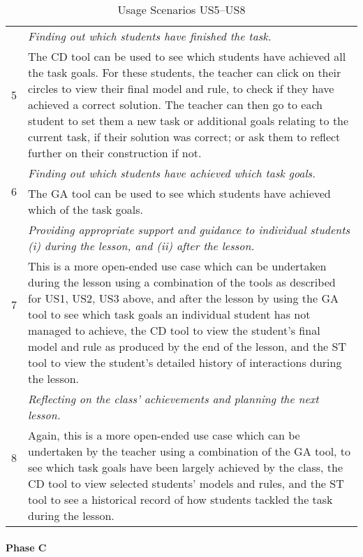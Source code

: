 \begin{table}[htbp]
  \begin{tabular}{|p{0.5cm}|p{12.5cm}|}
  \hline \multirow{2}{*}{5}
  & \emph{Finding out which students have finished the task.} \\
  \cline{2-2}
  & The CD tool can be used to see which students have achieved all
  the task goals. For these students, the teacher can click on their
  circles to view their final model and rule, to check if they have
  achieved a correct solution. The teacher can then go to each student
  to set them a new task or additional goals relating to the current
  task, if their solution was correct; or ask them to reflect further
  on their construction if not. \\
  \hline \multirow{2}{*}{6}
  & \emph{Finding out which students have achieved which task goals.} \\
  \cline{2-2}
  & The GA tool can be used to see which students have achieved which
  of the task goals. \\
  \hline \multirow{2}{*}{7}
  & \emph{Providing appropriate support and guidance to individual
  students (i) during the lesson, and (ii) after the lesson.} \\
  \cline{2-2}
  &  This is a more open-ended use case which can be undertaken during
  the lesson using a combination of the tools as described for US1,
  US2, US3 above, and after the lesson by using the GA tool to see
  which task goals an individual student has not managed to achieve,
  the CD tool to view the student's final model and rule as produced
  by the end of the lesson, and the ST tool to view the student's
  detailed history of interactions
  during the lesson.  \\
  \hline \multirow{2}{*}{8}
  & \emph{Reflecting on the class' achievements and planning the next
  lesson.} \\
  \cline{2-2}
  &  Again, this is a more open-ended use case which can be undertaken by
  the teacher using a combination of the GA tool, to see which task
  goals have been largely achieved by the class, the CD tool to view
  selected students' models and rules, and the ST tool to see a
  historical record of how students tackled the task during the
  lesson.
   \\
  \hline
  \end{tabular}
  \caption{Usage Scenarios US5--US8}
  \label{tab:UsageScenariosB}
\end{table}
 
\paragraph{Phase C}
\label{sec:phase-c}


